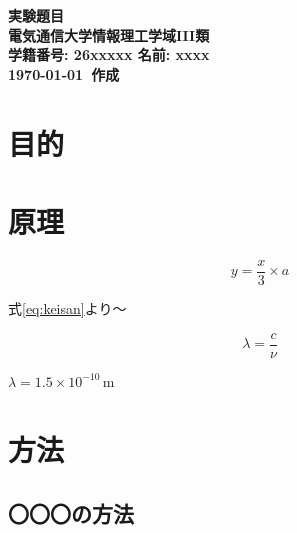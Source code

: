 \documentclass[dvipdfmx, a4paper, 10pt]{jsarticle} %
\begin{document}
\begin{center} %
  {\huge \textbf{実験題目}} \\[1em] %
  {\large \textbf{電気通信大学情報理工学域I\hspace{-1.2pt}I\hspace{-1.2pt}I類}} \\ %
  {\large \textbf{学籍番号: 26xxxxx \quad 名前: xxxx}} \\[1em] %
  {\textbf{\today\ 作成}} %
\end{center}

\section{目的}


\section{原理}


\begin{equation} %
  y = \frac{x}{3} \times a %
  \label{eq:keisan} %
\end{equation}

式\eqref{eq:keisan}より～ %

\begin{equation*}
  \lambda = \frac{c}{\nu} %
\end{equation*} %

$\lambda = 1.5 \times 10^{-10} \, \mathrm{m}$ 


\section{方法}

\subsection{〇〇〇の方法}
\end{document}
